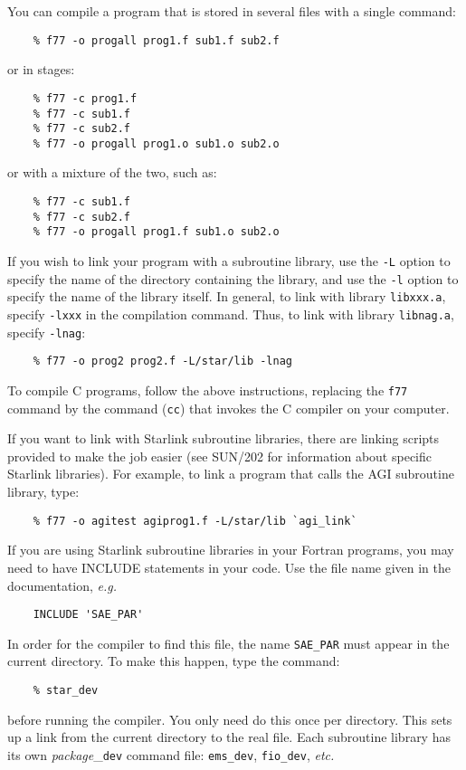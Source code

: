 \documentclass[twoside,11pt]{article}
\newcommand{\xref}[3]{#1}
\begin{document}
You can compile a program that is stored in several files with a single command:
\begin{verbatim}
    % f77 -o progall prog1.f sub1.f sub2.f
\end{verbatim}
or in stages:
\begin{verbatim}
    % f77 -c prog1.f
    % f77 -c sub1.f
    % f77 -c sub2.f
    % f77 -o progall prog1.o sub1.o sub2.o
\end{verbatim}
or with a mixture of the two, such as:
\begin{verbatim}
    % f77 -c sub1.f
    % f77 -c sub2.f
    % f77 -o progall prog1.f sub1.o sub2.o
\end{verbatim}
If you wish to link your program with a subroutine library, use the {\tt -L}
option to specify the name of the directory containing the library, and use the
{\tt -l} option to specify the name of the library itself.
In general, to link with library {\tt libxxx.a}, specify {\tt -lxxx} in the
compilation command.
Thus, to link with library {\tt libnag.a}, specify {\tt -lnag}:
\begin{verbatim}
    % f77 -o prog2 prog2.f -L/star/lib -lnag
\end{verbatim}
To compile C programs, follow the above instructions, replacing the {\tt f77}
command by the command ({\tt cc}) that invokes the C compiler on your computer.

If you want to link with Starlink subroutine libraries, there are linking
scripts provided to make the job easier (see
\xref{SUN/202}{sun202}{} for information about
specific Starlink libraries).
For example, to link a program that calls the AGI
subroutine library, type:
\begin{verbatim}
    % f77 -o agitest agiprog1.f -L/star/lib `agi_link`
\end{verbatim}
If you are using Starlink subroutine libraries in your Fortran programs, you
may need to have INCLUDE statements in your code.
Use the file name given in the documentation, {\em e.g.}
\begin{verbatim}
    INCLUDE 'SAE_PAR'
\end{verbatim}
In order for the compiler to find this file, the name {\tt SAE\_PAR}
must appear in the current directory.
To make this happen, type the command:
\begin{verbatim}
    % star_dev
\end{verbatim}
before running the compiler.
You only need do this once per directory.
This sets up a link from the current directory to the real file.
Each subroutine library has its own {\em package}\_{\tt dev} command file:
{\tt ems\_dev}, {\tt fio\_dev}, {\em etc.}
\end{document}
